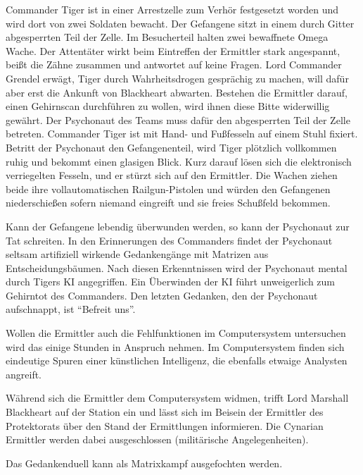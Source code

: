 Commander Tiger ist in einer Arrestzelle zum Verhör festgesetzt worden und wird dort von zwei Soldaten bewacht. Der Gefangene sitzt in einem durch Gitter abgesperrten Teil der Zelle. Im Besucherteil halten zwei bewaffnete Omega Wache. Der Attentäter wirkt beim Eintreffen der Ermittler stark angespannt, beißt die Zähne zusammen und antwortet auf keine Fragen. Lord Commander Grendel erwägt, Tiger durch Wahrheitsdrogen gesprächig zu machen, will dafür aber erst die Ankunft von Blackheart abwarten. Bestehen die Ermittler darauf, einen Gehirnscan durchführen zu wollen, wird ihnen diese Bitte widerwillig gewährt. Der Psychonaut des Teams muss dafür den abgesperrten Teil der Zelle betreten. Commander Tiger ist mit Hand- und Fußfesseln auf einem Stuhl fixiert. Betritt der Psychonaut den Gefangenenteil, wird Tiger plötzlich vollkommen ruhig und bekommt einen glasigen Blick. Kurz darauf lösen sich die elektronisch verriegelten Fesseln, und er stürzt sich auf den Ermittler. Die Wachen ziehen beide ihre vollautomatischen Railgun-Pistolen und würden den Gefangenen niederschießen sofern niemand eingreift und sie freies Schußfeld bekommen.

Kann der Gefangene lebendig überwunden werden, so kann der Psychonaut zur Tat schreiten. In den Erinnerungen des Commanders findet der Psychonaut seltsam artifiziell wirkende Gedankengänge mit Matrizen aus Entscheidungsbäumen. Nach diesen Erkenntnissen wird der Psychonaut mental durch Tigers KI angegriffen. Ein Überwinden der KI führt unweigerlich zum Gehirntot des Commanders. Den letzten Gedanken, den der Psychonaut aufschnappt, ist "`Befreit uns"'.

Wollen die Ermittler auch die Fehlfunktionen im Computersystem untersuchen wird das einige Stunden in Anspruch nehmen. Im Computersystem finden sich eindeutige Spuren einer künstlichen Intelligenz, die ebenfalls etwaige Analysten angreift.

Während sich die Ermittler dem Computersystem widmen, trifft Lord Marshall Blackheart auf der Station ein und lässt sich im Beisein der Ermittler des Protektorats über den Stand der Ermittlungen informieren. Die Cynarian Ermittler werden dabei ausgeschlossen (militärische Angelegenheiten).

\begin{remarks}
	Das Gedankenduell kann als Matrixkampf ausgefochten werden.
\end{remarks}
